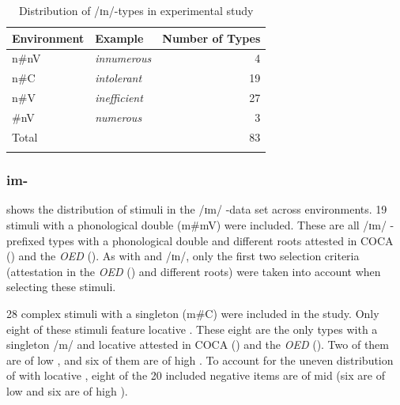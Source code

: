 \begin{table}
	\caption{Distribution of /ɪn/-types in experimental study}
	\label{tbl:distribution of in  types in experiment}

	
		\begin{tabular} {llr}
\lsptoprule
			Environment & Example & Number of  Types\\

			\midrule
			n\#nV&\color{lsMidBlue}\textit{innumerous} & 4 \\ 

			n\#C&\color{lsMidBlue}\textit{intolerant} & 19 \\ 
						n\#V&\color{lsMidBlue}\textit{inefficient} & 27 \\ 
			\#nV&\color{lsMidBlue}\textit{numerous} & 3\\ 
			\midrule   
			Total&  & 83 \\ 
			\lspbottomrule                                                                                
		\end{tabular}
	
\end{table}


\subsubsection{im-}

 shows the distribution of  stimuli in the /ɪm/ -data set across environments. 19 stimuli with a phonological double ({m\#mV}) were included. These are all /ɪm/ -prefixed types with a phonological double and different roots attested in  {COCA} (\citealt{Davies.20082014}) and the \textit{OED} (\citealt{OED.2013}). As with  and /ɪn/, only the first two selection criteria (attestation in the \textit{OED} (\citealt{OED.2013}) and different roots) were taken into account when selecting these stimuli.


28 complex stimuli with a singleton ({m\#C}) were included in the study. Only eight of these stimuli feature locative . These eight are the only types with a singleton /m/ and locative  attested in  {COCA} (\citealt{Davies.20082014}) and the \textit{OED} (\citealt{OED.2013}). Two of them are of low , and six of them are of high .
 To account for the uneven distribution of  with locative , eight of the 20 included negative items are of mid  (six are of low and six are of high ).


